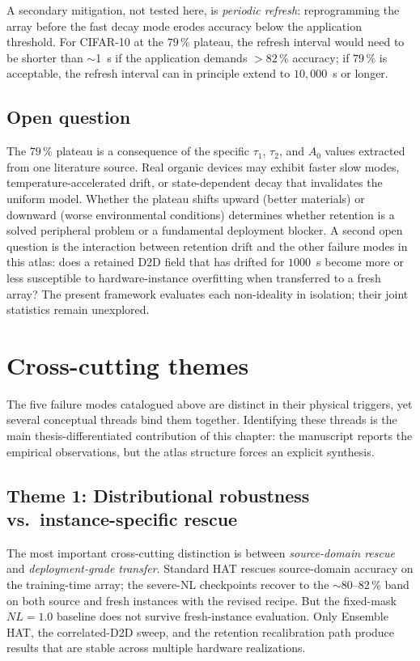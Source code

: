 A secondary mitigation, not tested here, is \emph{periodic refresh}: reprogramming the array before the fast decay mode erodes accuracy below the application threshold.  For CIFAR-10 at the $79\,\%$ plateau, the refresh interval would need to be shorter than $\sim$1~s if the application demands $>82\,\%$ accuracy; if $79\,\%$ is acceptable, the refresh interval can in principle extend to $10{,}000$~s or longer.

\subsection{Open question}

The $79\,\%$ plateau is a consequence of the specific $\tau_{1}$, $\tau_{2}$, and $A_{0}$ values extracted from one literature source.  Real organic devices may exhibit faster slow modes, temperature-accelerated drift, or state-dependent decay that invalidates the uniform model.  Whether the plateau shifts upward (better materials) or downward (worse environmental conditions) determines whether retention is a solved peripheral problem or a fundamental deployment blocker.  A second open question is the interaction between retention drift and the other failure modes in this atlas: does a retained D2D field that has drifted for $1000$~s become more or less susceptible to hardware-instance overfitting when transferred to a fresh array?  The present framework evaluates each non-ideality in isolation; their joint statistics remain unexplored.


\section{Cross-cutting themes}
\label{sec:cross-cutting-themes}

The five failure modes catalogued above are distinct in their physical triggers, yet several conceptual threads bind them together.  Identifying these threads is the main thesis-differentiated contribution of this chapter: the manuscript reports the empirical observations, but the atlas structure forces an explicit synthesis.

\subsection{Theme 1: Distributional robustness vs.~instance-specific rescue}

The most important cross-cutting distinction is between \emph{source-domain rescue} and \emph{deployment-grade transfer}.  Standard HAT rescues source-domain accuracy on the training-time array; the severe-NL checkpoints recover to the $\sim$80--82\,\% band on both source and fresh instances with the revised recipe.  But the fixed-mask $NL=1.0$ baseline does not survive fresh-instance evaluation.  Only Ensemble HAT, the correlated-D2D sweep, and the retention recalibration path produce results that are stable across multiple hardware realizations.

